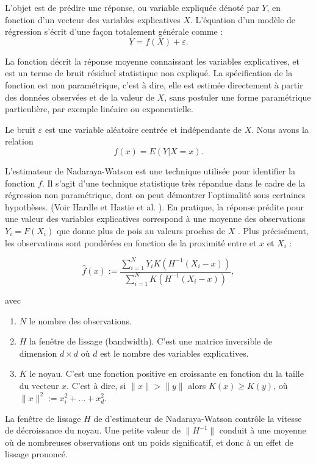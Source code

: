 \documentclass[12pt, a4paper]{book}
\begin{document}
L'objet est de prédire une réponse, ou variable expliquée dénoté par $Y$, en fonction d'un vecteur des  variables explicatives $X$. L'équation d'un modèle de régression s'écrit d'une façon totalement générale comme :
$$ Y = f(X) +\varepsilon.$$

La fonction décrit la réponse moyenne connaissant les variables explicatives, et est un terme de bruit résiduel statistique non expliqué. La spécification de la fonction est non paramétrique, c'est à dire, elle est estimée directement à partir des données observées et de la valeur de $X$, sans postuler une forme paramétrique particulière, par exemple linéaire ou exponentielle. 

Le bruit $\varepsilon$ est une variable aléatoire centrée et indépendante de $X$. Nous avons la relation
$$f(x) = E(Y| X=x).$$

L'estimateur de Nadaraya-Watson est une technique utilisée pour identifier la fonction  $f$. Il s'agit d'une technique statistique très répandue dans le cadre de la régression non paramétrique, dont on peut démontrer l'optimalité sous certaines hypothèses. (Voir Hardle \cite{H} et  Hastie et al. \cite{HFT}). En pratique, la réponse prédite pour une valeur des variables explicatives correspond à une moyenne des observations $Y_i=F(X_i)$ que donne plus de pois au valeurs proches de $X$ . Plus précisément, les observations sont pondérées en fonction de la proximité entre et $x$ et $X_i$ :

\begin{equation}
\label{NW}
\hat{f}(x) := \frac{\sum_{i=1}^N Y_i K(H^{-1}(X_i-x))}{\sum_{i=1}^N K(H^{-1}(X_i-x))},
\end{equation}

avec 

\begin{enumerate}
\item $N$ le nombre des observations.
\item $H$ la fenêtre de lissage (bandwidth). C'est une matrice inversible de dimension $d\times d$ où $d$ est le nombre des variables explicatives.
\item $K$ le noyau. C'est une fonction positive en croissante en fonction du la taille du vecteur $x$. C'est à dire, si $\|x\|>\|y\|$ alors $K(x)\geq K(y)$, où $\|x\|^2 :=x_i^2+\ldots + x_d^2.$
\end{enumerate}


La fenêtre de lissage $H$ de d'estimateur de Nadaraya-Watson contrôle la vitesse de décroissance du noyau. Une petite valeur de $\|H^{-1}\|$ conduit à une moyenne où de nombreuses observations ont un poids significatif, et donc à un effet de lissage prononcé.
\end{document}

